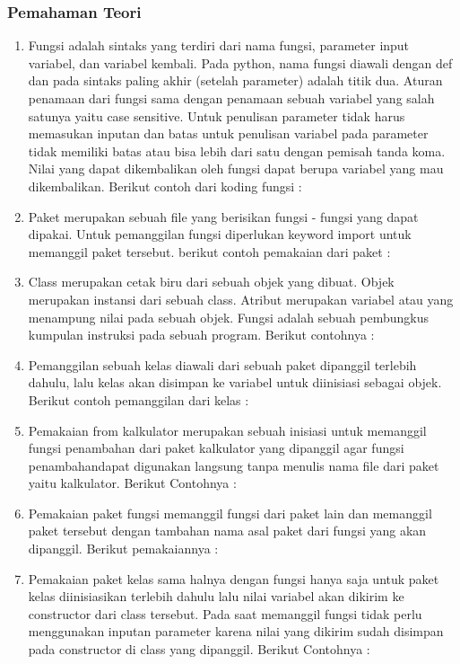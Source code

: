 \subsubsection{Pemahaman Teori}
\begin{enumerate}
	\item Fungsi adalah sintaks yang terdiri dari nama fungsi, parameter input variabel, dan variabel kembali. Pada python, nama fungsi diawali dengan def dan pada sintaks paling akhir (setelah parameter) adalah titik dua. Aturan penamaan dari fungsi sama dengan penamaan sebuah variabel yang salah satunya yaitu case sensitive. Untuk penulisan parameter tidak harus memasukan inputan dan batas untuk penulisan variabel pada parameter tidak memiliki batas atau bisa lebih dari satu dengan pemisah tanda koma. Nilai yang dapat dikembalikan oleh fungsi dapat berupa variabel yang mau dikembalikan. Berikut contoh dari koding fungsi : 
	
	\item Paket merupakan sebuah file yang berisikan fungsi - fungsi yang dapat dipakai. Untuk pemanggilan fungsi diperlukan keyword import untuk memanggil paket tersebut. berikut contoh pemakaian dari paket : 
	
	\item Class merupakan cetak biru dari sebuah objek yang dibuat. Objek merupakan instansi dari sebuah class. Atribut merupakan variabel atau yang menampung nilai pada sebuah objek. Fungsi adalah sebuah pembungkus kumpulan instruksi pada sebuah program. Berikut contohnya : 
	
	\item Pemanggilan sebuah kelas diawali dari sebuah paket dipanggil terlebih dahulu, lalu kelas akan disimpan ke variabel untuk diinisiasi sebagai objek. Berikut contoh pemanggilan dari kelas : 
	
	\item Pemakaian from kalkulator merupakan sebuah inisiasi untuk memanggil fungsi penambahan dari paket kalkulator yang dipanggil agar fungsi penambahandapat digunakan langsung tanpa menulis nama file dari paket yaitu kalkulator. Berikut Contohnya : 
	
	\item Pemakaian paket fungsi memanggil fungsi dari paket lain dan memanggil paket tersebut dengan tambahan nama asal paket dari fungsi yang akan dipanggil. Berikut pemakaiannya : 
	
	\item Pemakaian paket kelas sama halnya dengan fungsi hanya saja untuk paket kelas diinisiasikan terlebih dahulu lalu nilai variabel akan dikirim ke constructor dari class tersebut. Pada saat memanggil fungsi tidak perlu menggunakan inputan parameter karena nilai yang dikirim sudah disimpan pada constructor di class yang dipanggil. Berikut Contohnya : 
	
\end{enumerate}
